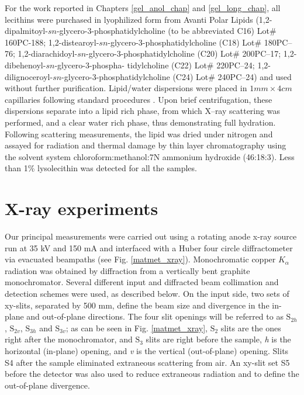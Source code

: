 For the work reported in Chapters \ref{gel_anol_chap} and \ref{gel_long_chap},
all lecithins were purchased in lyophilized form from Avanti Polar Lipids
(1,2-dipalmitoyl-$sn$-glycero-3-phosphatidylcholine (to be 
abbreviated C16) Lot\# 160PC-188; 
1,2-distearoyl-$sn$-glycero-3-phosphatidylcholine (C18) 
Lot\# 180PC--76; 1,2-diarachidoyl-$sn$-glycero-3-phosphatidylcholine (C20)
Lot\# 200PC--17; 1,2-dibehenoyl-$sn$-glycero-3-phospha- tidylcholine (C22)
Lot\# 220PC--24; 1,2-dilignoceroyl-$sn$-glycero-3-phosphatidylcholine (C24)
Lot\# 240PC--24) and used without further purification.
Lipid/water dispersions were placed in $1mm \times 4cm$ capillaries following 
standard procedures \cite{STN92}. Upon brief centrifugation, these dispersions 
separate into a lipid rich phase, from which X--ray scattering was performed, 
and a clear water rich phase, thus demonstrating full hydration.  
Following scattering measurements, the lipid was dried under nitrogen
and assayed for radiation and thermal damage by thin layer chromatography 
using the solvent system chloroform:methanol:7N ammonium hydroxide (46:18:3).
Less than 1\% lysolecithin was detected for all the samples.

\section{X-ray experiments}

Our principal measurements were carried out using a rotating anode x-ray 
source run at 35 kV and 150 mA and interfaced with a Huber four circle
diffractometer via evacuated beampaths (see Fig. \ref{matmet_xray}).
Monochromatic copper $K_{\alpha}$ radiation was obtained
by diffraction from a vertically bent graphite monochromator.
Several different input and diffracted beam collimation and
detection schemes were used, as described below. On the input side,
two sets of xy-slits, separated by 500 mm, define the beam size
and divergence in the in-plane and out-of-plane directions.
The four slit openings will be referred to as $\mbox{S}_{2h}$, 
$\mbox{S}_{2v}$, $\mbox{S}_{3h}$ and $\mbox{S}_{3v}$; as can be seen
in Fig. \ref{matmet_xray}, $\mbox{S}_{2}$ slits are the ones right
after the monochromator, and $\mbox{S}_{3}$ slits are right before
the sample, {\em h} is the horizontal (in-plane) opening, 
and {\em v} is the vertical (out-of-plane) opening. Slits S4 after the sample 
eliminated extraneous scattering from air.  An xy-slit set S5 before the 
detector was also used to reduce extraneous radiation and to define the
out-of-plane divergence.

